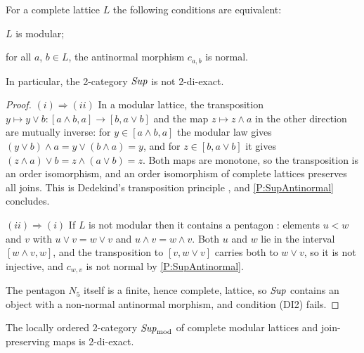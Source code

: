 \begin{proposition}
  \label{P:SupModular}   \leanok
  For a complete lattice \(L\) the following conditions are equivalent:
	\begin{tfae}
		\item \(L\) is modular;
		\item for all \(a\), \(b\in L\), the antinormal morphism \(c_{a,b}\) is normal.
	\end{tfae}
	In particular, the 2-category \(\mathit{Sup}\) is not 2-di-exact.
\end{proposition}

\begin{proof}
  \leanok
  \((i)\Rightarrow(ii)\) In a modular lattice, the transposition \(y\mapsto y\vee b\colon[a\wedge b,a]\to[b,a\vee b]\) and the map \(z\mapsto z\wedge a\) in the other direction are mutually inverse: for \(y\in[a\wedge b,a]\) the modular law gives \((y\vee b)\wedge a=y\vee(b\wedge a)=y\), and for \(z\in[b,a\vee b]\) it gives \((z\wedge a)\vee b=z\wedge(a\vee b)=z\). Both maps are monotone, so the transposition is an order isomorphism, and an order isomorphism of complete lattices preserves all joins. This is Dedekind's transposition principle \cite[Chapter~I, Theorem~13]{Birkhoff}, and \prox\ref{P:SupAntinormal} concludes.

	\((ii)\Rightarrow(i)\) If \(L\) is not modular then it contains a pentagon \cite[Chapter~I, Theorem~12]{Birkhoff}: elements \(u<w\) and \(v\) with \(u\vee v=w\vee v\) and \(u\wedge v=w\wedge v\). Both \(u\) and \(w\) lie in the interval \([w\wedge v,w]\), and the transposition to \([v,w\vee v]\) carries both to \(w\vee v\), so it is not injective, and \(c_{w,v}\) is not normal by \prox\ref{P:SupAntinormal}.

	The pentagon \(N_{5}\) itself is a finite, hence complete, lattice, so \(\mathit{Sup}\) contains an object with a non-normal antinormal morphism, and condition \textup{(DI2)} fails.
\end{proof}

\begin{theorem}
  \label{T:LatticeModel}   \leanok
  The locally ordered 2-category \(\mathit{Sup}_{\mathrm{mod}}\) of complete modular lattices and join-preserving maps is 2-di-exact.
\end{theorem}

